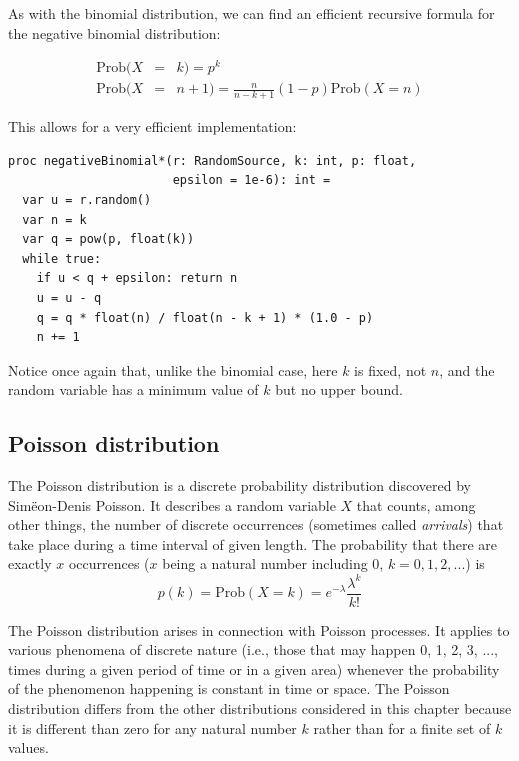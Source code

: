 \documentclass[justified, sixbynine]{tufte-book}
\def\ft{\small\tt}
\theoremstyle{plain}%
\newtheorem * {corollary}{Corollary}
\theoremstyle{definition}
\theoremstyle{remark}
\newtheorem * {remark}{Remark}
\newtheorem * {note}{Note}
\begin{document}
\begin{fullwidth}
As with the binomial distribution, we can find an efficient recursive formula for the 
negative binomial distribution:

\begin{eqnarray}
\textrm{Prob}(X &=& k) = p^k \\
\textrm{Prob}(X &=& n+1)=\frac{n}{n-k+1}(1-p)\textrm{Prob}(X=n)
\end{eqnarray}

This allows for a very efficient implementation:

\begin{lstlisting}[caption={in file: {\ft nlib.nim}}]
proc negativeBinomial*(r: RandomSource, k: int, p: float,
                       epsilon = 1e-6): int =
  var u = r.random()
  var n = k
  var q = pow(p, float(k))
  while true:
    if u < q + epsilon: return n
    u = u - q
    q = q * float(n) / float(n - k + 1) * (1.0 - p)
    n += 1
\end{lstlisting}

Notice once again that, unlike the binomial case, here $k$ is fixed, not $n$, and the random variable has a minimum value of $k$ but no upper bound.

\goodbreak\subsection{Poisson distribution}


The Poisson distribution is a discrete probability distribution discovered
by Sim\"{e}on-Denis Poisson. It describes a random variable
$X$ that counts, among other things, the number of
discrete occurrences (sometimes called {\it arrivals}) that take place during
a time interval of given length. The probability that there are exactly $x$
occurrences ($x$ being a natural number including 0, $k=0, 1, 2, ...$) is
\begin{equation}
p(k)=\textrm{Prob}(X=k)=e^{-\lambda }\frac{\lambda ^k}{k!}
\end{equation}

The Poisson distribution arises in connection with Poisson processes. It
applies to various phenomena of discrete nature (i.e., those that may
happen 0, 1, 2, 3, ..., times during a given period of time or in a given
area) whenever the probability of the phenomenon happening is constant in
time or space. The Poisson distribution differs from the other distributions
considered in this chapter because it is different than zero for any natural
number $k$ rather than for a finite set of $k$ values.


\end{fullwidth}
\end{document}

